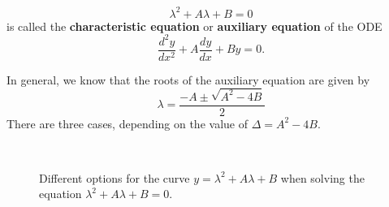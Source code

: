 \begin{definition}
\[\lambda^2+A\lambda+B=0\] is called the \textbf{characteristic equation} or \textbf{auxiliary equation} of the ODE \[\frac{d^2y}{dx^2} + A\frac{dy}{dx} + By = 0.\]
\end{definition}

In general, we know that the roots of the auxiliary equation are given by
\[\lambda = \frac{-A\pm\sqrt{A^2-4B}}{2}\]
There are three cases, depending on the value of $\Delta=A^2-4B$.
\begin{figure}[H]
    \hspace{0.2cm}
    \hspace{0.5cm}
        \hspace{0.5cm}
     \\
    \centering
  \caption{Different options for the curve $y=\lambda^2+A\lambda+B$ when solving the equation $\lambda^2+A\lambda+B=0$.}
\end{figure}


